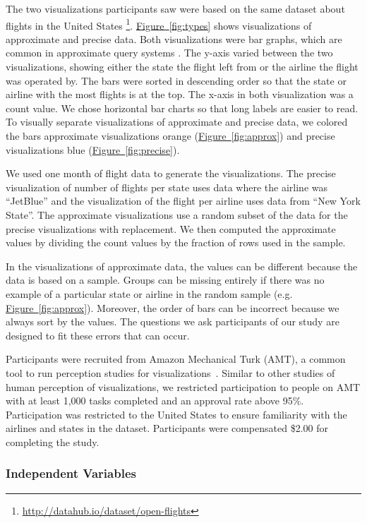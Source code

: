 \documentclass[10pt,journal,compsoc]{IEEEtran}
\newcommand{\figref}[1]{\hyperref[#1]{Figure~\ref*{#1}}}
\begin{document}
The two visualizations participants saw were based on the same dataset about flights in the United States \footnote{\url{http://datahub.io/dataset/open-flights}}.
\figref{fig:types} shows visualizations of approximate and precise data.
Both visualizations were bar graphs, which are common in approximate query systems \cite{moritz2017pangloss}.
The y-axis varied between the two visualizations, showing either the state the flight left from or the airline the flight was operated by.
The bars were sorted in descending order so that the state or airline with the most flights is at the top.
The x-axis in both visualization was a count value.
We chose horizontal bar charts so that long labels are easier to read.
To visually separate visualizations of approximate and precise data, we colored the bars approximate visualizations orange (\figref{fig:approx}) and precise visualizations blue (\figref{fig:precise}). 

We used one month of flight data to generate the visualizations.
The precise visualization of number of flights per state uses data where the airline was ``JetBlue'' and the visualization of the flight per airline uses data from ``New York State''.
The approximate visualizations use a random subset of the data for the precise visualizations with replacement.
We then computed the approximate values by dividing the count values by the fraction of rows used in the sample.

In the visualizations of approximate data, the values can be different because the data is based on a sample.
Groups can be missing entirely if there was no example of a particular state or airline in the random sample (e.g. \figref{fig:approx}).
Moreover, the order of bars can be incorrect because we always sort by the values.
The questions we ask participants of our study are designed to fit these errors that can occur.

Participants were recruited from Amazon Mechanical Turk (AMT), a common tool to run perception studies for visualizations~\cite{heer2010crowdsourcing}.
Similar to other studies of human perception of visualizations, we restricted participation to people on AMT with at least 1,000 tasks completed and an approval rate above 95\%.
Participation was restricted to the United States to ensure familiarity with the airlines and states in the dataset.
Participants were compensated \$2.00 for completing the study.

\subsubsection{Independent Variables}
\end{document}
